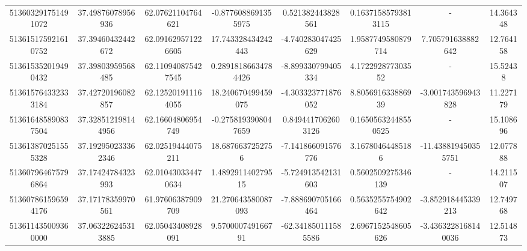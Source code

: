 \documentclass{article}
\begin{document}
\begin{landscape}
\begin{longtable}[c]{S[table-format=18.0]S[table-format=2.15]S[table-format=2.15]S[table-format=-2.17]S[table-format=-2.16]S[table-format=-2.16]S[table-format=-3.16]S[table-format=2.7]}
513603291751491072 & 37.49876078956936  & 62.07621104764621  & -0.8776088691355975  & 0.521382443828561    & 0.16371585793813115  & {-}                  & 14.364348  \\
513615175921610752 & 37.39460432442672  & 62.091629571226605 & 17.743328434242443   & -4.740283047425629   & 1.9587749580879714   & 7.705791638882642   & 12.764158  \\
513615352019490432 & 37.39803959568485  & 62.110940875427545 & 0.28918186634784426  & -8.899330799405334   & 4.172292877303552    & {-}                  & 15.52438   \\
513615764332333184 & 37.42720196082857  & 62.125201911164055 & 18.240670499459075   & -4.303323771876052   & 8.805691633886939    & -3.001743596943828  & 11.227179  \\
513616485890837504 & 37.328512198144956 & 62.16604806954749  & -0.2758193908047659  & 0.8494417062603126   & 0.16505632448550525  & {-}                  & 15.108696  \\
513613870251555328 & 37.192950233362346 & 62.02519444075211  & 18.6876637252756     & -7.141866091576776   & 3.16780464485186     & -11.438819450355751 & 12.077888  \\
513607964675796864 & 37.17424784323993  & 62.010430334470634 & 1.489291140279515    & -5.724913542131603   & 0.5602509275346139   & {-}                  & 14.211507  \\
513607861596594176 & 37.17178359970561  & 61.97606387909709  & 21.270643580087093   & -7.888690705166464   & 0.5635255754902642   & -3.852918445339213  & 12.749768  \\
513611435009360000 & 37.063226245313885 & 62.05043408928091  & 9.570000749166791    & -62.341850111585586  & 2.6967152548605626   & -3.4363228168140036 & 12.514873 
 \end{longtable}


\end{landscape}
\end{document}

